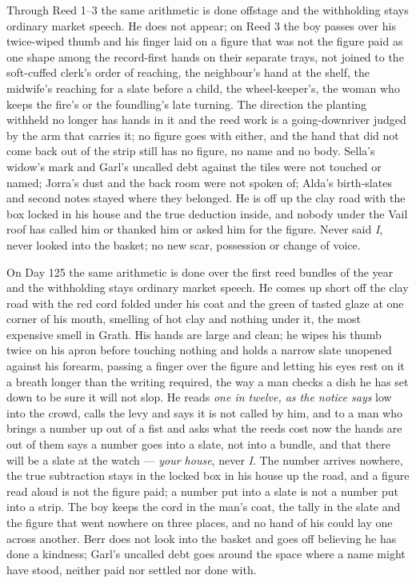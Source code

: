 \documentclass{design/chronicle}
\begin{document}
{Through Reed 1–3 the same arithmetic is done offstage and the withholding stays ordinary market speech. He does not appear; on Reed 3 the boy passes over his twice-wiped thumb and his finger laid on a figure that was not the figure paid as one shape among the record-first hands on their separate trays, not joined to the soft-cuffed clerk’s order of reaching, the neighbour’s hand at the shelf, the midwife’s reaching for a slate before a child, the wheel-keeper’s, the woman who keeps the fire’s or the foundling’s late turning. The direction the planting withheld no longer has hands in it and the reed work is a going-downriver judged by the arm that carries it; no figure goes with either, and the hand that did not come back out of the strip still has no figure, no name and no body. Sella’s widow’s mark and Garl’s uncalled debt against the tiles were not touched or named; Jorra’s dust and the back room were not spoken of; Alda’s birth-slates and second notes stayed where they belonged. He is off up the clay road with the box locked in his house and the true deduction inside, and nobody under the Vail roof has called him or thanked him or asked him for the figure. Never said \emph{I}, never looked into the basket; no new scar, possession or change of voice.

On Day 125 the same arithmetic is done over the first reed bundles of the year and the withholding stays ordinary market speech. He comes up short off the clay road with the red cord folded under his coat and the green of tasted glaze at one corner of his mouth, smelling of hot clay and nothing under it, the most expensive smell in Grath. His hands are large and clean; he wipes his thumb twice on his apron before touching nothing and holds a narrow slate unopened against his forearm, passing a finger over the figure and letting his eyes rest on it a breath longer than the writing required, the way a man checks a dish he has set down to be sure it will not slop. He reads \emph{one in twelve, as the notice says} low into the crowd, calls the levy and says it is not called by him, and to a man who brings a number up out of a fist and asks what the reeds cost now the hands are out of them says a number goes into a slate, not into a bundle, and that there will be a slate at the watch — \emph{your house}, never \emph{I}. The number arrives nowhere, the true subtraction stays in the locked box in his house up the road, and a figure read aloud is not the figure paid; a number put into a slate is not a number put into a strip. The boy keeps the cord in the man’s coat, the tally in the slate and the figure that went nowhere on three places, and no hand of his could lay one across another. Berr does not look into the basket and goes off believing he has done a kindness; Garl’s uncalled debt goes around the space where a name might have stood, neither paid nor settled nor done with.

}
\end{document}
